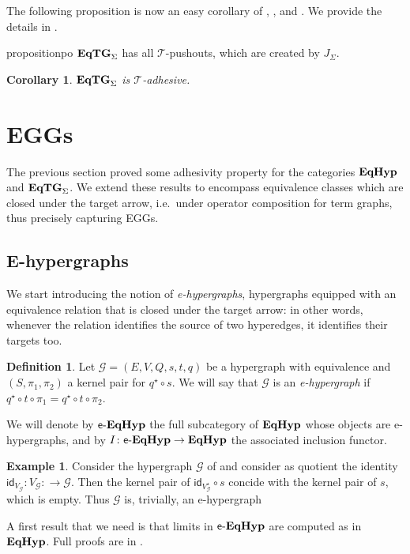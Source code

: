 \documentclass[a4paper,UKenglish,cleveref,pdftex,amsthm,thm-restate,numberwithinsect]{cas-sc}
\theoremstyle{plain}
\newtheorem{corollary}[theorem]{Corollary}
\theoremstyle{definition}
\newtheorem{definition}[theorem]{Definition}
\newtheorem{example}[theorem]{Example}
\newcommand{\catname}[1]{\textbf{\textup{#1}}}
\newcommand{\EqHyp}{\catname{EqHyp}} %
\newcommand{\EqTG}{\catname{EqTG}}
\newcommand{\egg}{\mathsf{e}\text{-}\catname{EqHyp}}
\newcommand{\id}[1]{\mathsf{id}_{#1}}
\begin{document}
The following proposition is now an easy corollary of , , and . We provide the details in .


\begin{restatable}{proposition}{po}\label{prop:po}
$\EqTG_{\Sigma}$ has all $\mathcal{T}$-pushouts, which are created by $J_{\Sigma}$.
\end{restatable}

\begin{corollary}\label{cor:tade}
	$\EqTG_{\Sigma}$ is $\mathcal{T}$-adhesive.
\end{corollary}

\section{EGGs}
\label{eggs}
The previous section proved some adhesivity property for the categories $\EqHyp$ and $\EqTG_{\Sigma}$. We extend these results to
encompass equivalence classes which are closed under the target arrow, i.e.~under operator composition for term graphs, thus precisely capturing EGGs.
%

\subsection{E-hypergraphs}

We start introducing the notion of \emph{e-hypergraphs}, hypergraphs equipped with an equivalence relation that is closed under the target arrow:
in other words, whenever the relation identifies the source of two hyperedges, it identifies their targets too.

\begin{definition}
	Let $\mathcal{G} = (E, V, Q, s, t, q)$ be a hypergraph with equivalence and $(S, \pi_1, \pi_2)$ a kernel pair for $q^\star \circ s$.
	We will say that $\mathcal{G}$ is an \emph{e-hypergraph} if $q^\star \circ t \circ \pi_1 = q^\star \circ t \circ \pi_2$.
	
	We will denote by $\egg$ the full subcategory of $\EqHyp$ whose objects are e-hypergraphs, and by $I\colon \egg \to \EqHyp$ the associated inclusion functor.
\end{definition}


\begin{example}
	Consider the hypergraph $\mathcal{G}$ of  and consider as quotient the identity $\id{V_\mathcal{G}}\colon V_\mathcal{G}\colon \to\mathcal{G}$. Then the kernel pair of $\id{V^\star_\mathcal{G}} \circ s$ concide with the kernel pair of $s$, which is empty. Thus  $\mathcal{G}$ is, trivially, an e-hypergraph
\end{example}
A first result that we need is that limits in $\egg$ are computed as in $\EqHyp$. Full proofs are in .
\end{document}
